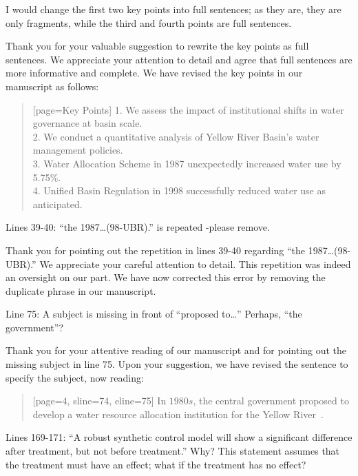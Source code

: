 \RC{} I would change the first two key points into full sentences; as they are, they are only fragments, while the third and fourth points are full sentences.

\AR{} Thank you for your valuable suggestion to rewrite the key points as full sentences. We appreciate your attention to detail and agree that full sentences are more informative and complete. We have revised the key points in our manuscript as follows:

\begin{quote}[page=Key Points]
    1.	We assess the impact of institutional shifts in water governance at basin scale.\\
    2.	We conduct a quantitative analysis of Yellow River Basin's water management policies.\\
    3.	Water Allocation Scheme in 1987 unexpectedly increased water use by 5.75\%.\\
    4.	Unified Basin Regulation in 1998 successfully reduced water use as anticipated.\\
\end{quote}

\RC{} Lines 39-40: ``the 1987\ldots (98-UBR).'' is repeated -please remove.

\AR{} Thank you for pointing out the repetition in lines 39-40 regarding ``the 1987\ldots (98-UBR).'' We appreciate your careful attention to detail. This repetition was indeed an oversight on our part. We have now corrected this error by removing the duplicate phrase in our manuscript.

\RC{} Line 75: A subject is missing in front of ``proposed to\ldots '' Perhaps, ``the government''?

\AR{} Thank you for your attentive reading of our manuscript and for pointing out the missing subject in line 75. Upon your suggestion, we have revised the sentence to specify the subject, now reading:

\begin{quote}[page=4, sline=74, eline=75]
    In $1980s$, the central government proposed to develop a water resource allocation institution for the Yellow River~\cite{wang2019d, wang2019e}.
\end{quote}

\RC{} Lines 169-171: ``A robust synthetic control model will show a significant difference after treatment, but not before treatment.'' Why? This statement assumes that the treatment must have an effect; what if the treatment has no effect?

